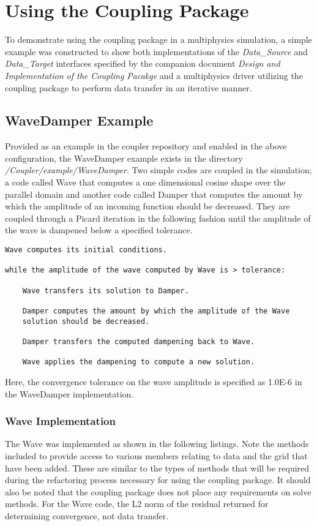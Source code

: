 \documentclass[letterpaper]{article}
\begin{document}
\section{Using the Coupling Package}
To demonstrate using the coupling package in a multiphysics
simulation, a simple example was constructed to show both
implementations of the {\sl Data\_Source} and {\sl Data\_Target}
interfaces specified by the companion document {\sl Design and
  Implementation of the Coupling Pacakge} and a multiphysics driver
utilizing the coupling package to perform data transfer in an
iterative manner.

\subsection{WaveDamper Example}
Provided as an example in the coupler repository and enabled in the
above configuration, the WaveDamper example exists in the directory
{\sl /Coupler/example/WaveDamper}. Two simple codes are coupled in the
simulation; a code called Wave that computes a one dimensional cosine
shape over the parallel domain and another code called Damper that
computes the amount by which the amplitude of an incoming function
should be decreased. They are coupled through a Picard iteration in
the following fashion until the amplitude of the wave is dampened
below a specified tolerance.

\begin{verbatim}
Wave computes its initial conditions.

while the amplitude of the wave computed by Wave is > tolerance:

    Wave transfers its solution to Damper.

    Damper computes the amount by which the amplitude of the Wave
    solution should be decreased.

    Damper transfers the computed dampening back to Wave.

    Wave applies the dampening to compute a new solution.
\end{verbatim}

Here, the convergence tolerance on the wave amplitude is specified as
1.0E-6 in the WaveDamper implementation.

\subsubsection{Wave Implementation}
The Wave was implemented as shown in the following listings. Note the
methods included to provide access to various members relating to data
and the grid that have been added. These are similar to the types of
methods that will be required during the refactoring process necessary
for using the coupling package. It should also be noted that the
coupling package does not place any requirements on solve methods. For
the Wave code, the L2 norm of the residual returned for determining
convergence, not data transfer.
\end{document}
